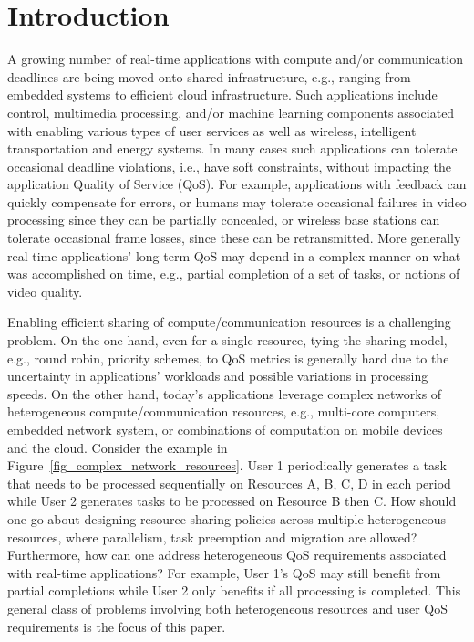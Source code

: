 \documentclass[prodmode,acmtompecs]{acmsmall}
\begin{document}
\section{Introduction}
\label{sec_introduction}
A growing number of real-time applications with compute and/or communication deadlines
are being moved onto shared infrastructure, e.g., ranging from embedded systems to efficient cloud infrastructure.
Such applications include control, multimedia processing, and/or machine learning components associated
with enabling various types of user services as well as wireless, intelligent transportation and energy systems.
In many cases such applications can tolerate occasional deadline violations, i.e., have soft 
constraints,  without impacting the application Quality of Service (QoS). For example, 
applications with feedback can quickly compensate for errors, or humans may tolerate occasional 
failures in video processing since they can be partially concealed, or wireless base stations can
tolerate occasional frame losses, since these can be retransmitted.
More generally real-time applications' long-term QoS may depend in a complex manner 
on what was accomplished on time, e.g., partial completion of a set of tasks, or notions of video quality. 

Enabling efficient sharing of compute/communication resources is a challenging problem. 
On the one hand, even for a single resource, tying the sharing model, e.g., 
round robin, priority schemes, to QoS metrics is generally hard due
to the uncertainty in applications' workloads and possible variations in processing speeds.
On the other hand, today's applications leverage complex networks of heterogeneous compute/communication resources, 
e.g., multi-core computers, embedded network system, or combinations of computation on mobile devices 
and the cloud. 
Consider the example in Figure~{\ref{fig_complex_network_resources}}. 
User 1 periodically generates a task that needs to be processed sequentially on Resources A, B, C, D in each 
period while User 2 generates tasks to be processed on Resource B then C. 
How should one go about designing resource sharing policies 
across multiple heterogeneous resources, where parallelism, task preemption and migration are allowed?
Furthermore, how can one address heterogeneous QoS requirements associated  
with real-time applications? For example, User 1's QoS may still benefit from partial completions while User 2 
only benefits if all processing is completed. 
This general class of problems involving both heterogeneous resources and user QoS requirements
is the focus of this paper. 
\end{document}
